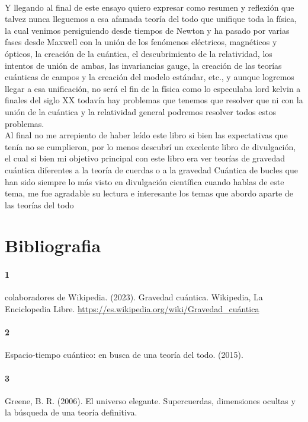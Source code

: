 \documentclass[12pt]{article}
\begin{document}
\paragraph*{}
\textsf{Y llegando al final de este ensayo quiero expresar como resumen y reflexión que talvez nunca lleguemos a esa afamada teoría del todo 
que unifique toda la física, la cual venimos persiguiendo desde tiempos de Newton y ha pasado por varias fases desde Maxwell
con la unión de los fenómenos eléctricos, magnéticos y ópticos, la creación de la cuántica, el descubrimiento de la
relatividad, los intentos de unión de ambas, las invariancias gauge, la creación de las teorías cuánticas de campos
y la creación del modelo estándar, etc., y aunque logremos llegar a esa unificación, no será el fin de la física como 
lo especulaba lord kelvin a finales del siglo XX todavía hay problemas que tenemos que resolver que ni con la unión 
de la cuántica y la relatividad general podremos resolver todos estos problemas.\\ Al final no me arrepiento de haber leído 
este libro si bien las expectativas que tenía no se cumplieron, por lo menos descubrí un excelente libro de divulgación, el cual 
si bien mi objetivo principal con este libro era ver teorías de gravedad cuántica diferentes a la teoría de cuerdas o a la gravedad
Cuántica de bucles que han sido siempre lo más visto en divulgación científica cuando hablas de este tema, me fue agradable su lectura
e interesante los temas que abordo aparte de las teorías del todo}
\newpage
\section*{Bibliografia}
\paragraph*{1}
\textsf{colaboradores de Wikipedia. (2023). Gravedad cuántica. Wikipedia, La Enciclopedia Libre.}
\url{https://es.wikipedia.org/wiki/Gravedad_cuántica}
\paragraph*{2}
\textsf{Espacio-tiempo cuántico: en busca de una teoría del todo. (2015).
}
\paragraph*{3}
\textsf{Greene, B. R. (2006). El universo elegante. Supercuerdas, dimensiones ocultas y la búsqueda de una teoría definitiva.}
\end{document}
